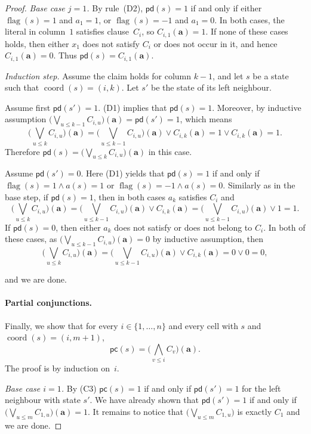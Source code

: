 \documentclass[10pt,a4paper]{amsart}
\DeclareMathOperator{\coord}{coord}
\DeclareMathOperator{\flag}{flag}
\newcommand{\pd}{\mathsf{pd}}
\newcommand{\tuple}{\mathbf}
\begin{document}
\begin{proof}
\emph{Base case $j=1$.}
By rule~(D2), $\mathsf{pd}(s)=1$ if and only if either
$\flag(s)=1$ and $a_1=1$, or $\flag(s)=-1$ and $a_1=0$.
In both cases, the literal in column~$1$ satisfies clause~$C_i$,
so $C_{i,1}(\tuple a)=1$.
If none of these cases holds, then either $x_1$ does not satisfy $C_i$
or does not occur in it, and hence $C_{i,1}(\tuple a)=0$.
Thus $\mathsf{pd}(s)=C_{i,1}(\tuple a)$.

\emph{Induction step.}
Assume the claim holds for column $k-1$, and let $s$ be a state such that
$\coord(s) = (i,k)$.  
Let $s'$ be the state of its left neighbour.

Assume first $\mathsf{pd}(s')=1$. (D1) implies that $\mathsf{pd}(s)=1$. Moreover, by inductive assumption $\bigl(\bigvee_{u \leq k-1} C_{i,u}\bigr)(\tuple a) = \pd(s') = 1$, which means  
\[
\bigl(\bigvee_{u \leq k} C_{i,u}\bigr)(\tuple a) = \bigl(\bigvee_{u \leq k-1} C_{i,u}\bigr)(\tuple a) \vee C_{i, k} (\tuple a)= 1 \vee C_{i, k} (\tuple a) =1.
\]
 Therefore $\mathsf{pd}(s) = \bigl(\bigvee_{u \leq k} C_{i,u}\bigr)(\tuple a)$ in this case.

Assume $\pd(s')=0$. Here (D1) yields that $\mathsf{pd}(s)=1$ if and only if $\flag(s)=1\wedge a(s)=1$ or $\flag(s)=-1\wedge a(s)=0$. Similarly as in the base step, if $\mathsf{pd}(s)=1$, then in both cases $a_{k}$ satisfies $C_i$ and 
 \[
 \bigl(\bigvee_{u \leq k} C_{i,u}\bigr)(\tuple a) = \bigl(\bigvee_{u \leq k-1} C_{i,u}\bigr)(\tuple a) \vee C_{i,k}(\tuple a) = \bigl(\bigvee_{u \leq k-1} C_{i,u}\bigr)(\tuple a) \vee 1=1.
 \]
   If $\mathsf{pd}(s)=0$, then either $a_{k}$ does not satisfy or does not belong to $C_i$. In both of these cases, as $\bigl(\bigvee_{u \leq k-1} C_{i,u}\bigr)(\tuple a) =0$ by inductive assumption, then 
    \[
 \bigl(\bigvee_{u \leq k} C_{i,u}\bigr)(\tuple a) = \bigl(\bigvee_{u \leq k-1} C_{i,u}\bigr)(\tuple a) \vee C_{i,k}(\tuple a) = 0 \vee 0=0,
 \]
   
 and we are done.

\paragraph{Partial conjunctions.}
Finally, we show that for every $i\in\{1,\dots,n\}$ and every cell with $s$ and
$\coord(s)=(i,m+1)$,
\[
\mathsf{pc}(s)=\bigl(\bigwedge_{v\le i} C_v\bigr)(\tuple a).
\]
The proof is by induction on~$i$.

\emph{Base case $i=1$.}
By (C3) $\mathsf{pc}(s)=1$ if and only if $\mathsf{pd}(s')=1$ for the left neighbour with state $s'$. We have already shown that $\mathsf{pd}(s')=1$ if and only if $\bigl(\bigvee_{u \leq m} C_{1,u}\bigr)(\tuple a) = 1$. It remains to notice that $(\bigvee_{u \leq m} C_{1,u}\bigr)$ is exactly $C_1$ and we are done.



\end{proof}
\end{document}
